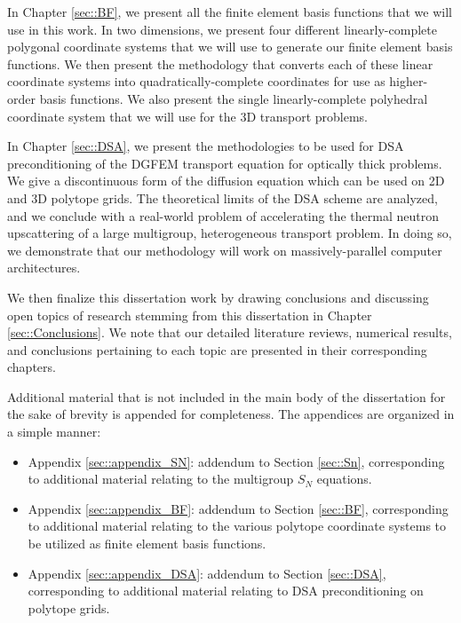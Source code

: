 In Chapter \ref{sec::BF}, we present all the finite element basis functions that we will use in this work. In two dimensions, we present four different linearly-complete polygonal coordinate systems that we will use to generate our finite element basis functions. We then present the methodology that converts each of these linear coordinate systems into quadratically-complete coordinates for use as higher-order basis functions. We also present the single linearly-complete polyhedral coordinate system that we will use for the 3D transport problems.

In Chapter \ref{sec::DSA}, we present the methodologies to be used for DSA preconditioning of the DGFEM transport equation for optically thick problems. We give a discontinuous form of the diffusion equation which can be used on 2D and 3D polytope grids. The theoretical limits of the DSA scheme are analyzed, and we conclude with a real-world problem of accelerating the thermal neutron upscattering of a large multigroup, heterogeneous transport problem. In doing so, we demonstrate that our methodology will work on massively-parallel computer architectures.

We then finalize this dissertation work by drawing conclusions and discussing open topics of research stemming from this dissertation in Chapter \ref{sec::Conclusions}. We note that our detailed literature reviews, numerical results, and conclusions pertaining to each topic are presented in their corresponding chapters.

Additional material that is not included in the main body of the dissertation for the sake of brevity is appended for completeness. The appendices are organized in a simple manner:

\begin{itemize}
\item Appendix \ref{sec::appendix_SN}: addendum to Section \ref{sec::Sn}, corresponding to additional material relating to the multigroup $S_N$ equations.
\item Appendix \ref{sec::appendix_BF}: addendum to Section \ref{sec::BF}, corresponding to additional material relating to the various polytope coordinate systems to be utilized as finite element basis functions.
\item Appendix \ref{sec::appendix_DSA}: addendum to Section \ref{sec::DSA}, corresponding to additional material relating to DSA preconditioning on polytope grids.
\end{itemize}